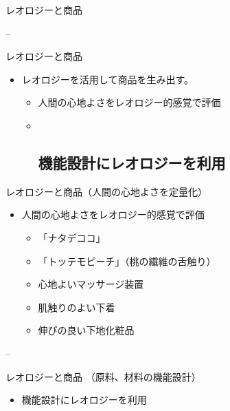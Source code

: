 \begin{frame}{レオロジーと商品}

--

\begin{block}{レオロジーと商品}

\begin{itemize}

\item
  レオロジーを活用して商品を生み出す。

  \begin{itemize}
  \item
    人間の心地よさをレオロジー的感覚で評価
  \item ~
    \subsection{機能設計にレオロジーを利用}
  \end{itemize}
\end{itemize}

\end{block}

\begin{block}{レオロジーと商品（人間の心地よさを定量化）}

\begin{itemize}

\item
  人間の心地よさをレオロジー的感覚で評価

  \begin{itemize}
  
  \item
    「ナタデココ」
  \item
    「トッテモピーチ」（桃の繊維の舌触り）
  \item
    心地よいマッサージ装置
  \item
    肌触りのよい下着
  \item
    伸びの良い下地化粧品
  \end{itemize}
\end{itemize}

--

\end{block}

\begin{block}{レオロジーと商品 （原料、材料の機能設計）}

\begin{itemize}

\item
  機能設計にレオロジーを利用


\end{itemize}
\end{block}
\end{frame}
